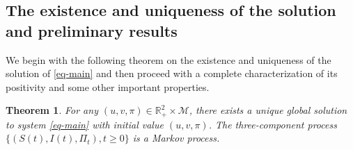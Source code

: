 \documentclass[12pt]{amsart}
\newtheorem{thm}{Theorem}[section]
\theoremstyle{remark}
\numberwithin{equation}{section}
\newcommand{\M}{\mathcal{M}}
\newcommand{\F}{\mathcal{F}}
\newcommand{\PP}{\mathbb{P}}
\newcommand{\R}{\mathbb{R}}
\numberwithin{equation}{section}
\newcommand{\1}{\boldsymbol{1}}
\begin{document}
\subsection{The existence and uniqueness of the solution and preliminary results}
We begin with the following theorem on the existence and uniqueness of the solution of \eqref{eq-main}
and then proceed with a complete characterization of its positivity and some other important properties.

\begin{thm}\label{thm-exi}
	For any $(u, v,\pi)\in\R_+^2\times\M$, there exists a unique global solution
to
system \eqref{eq-main} with initial value $(u,v,\pi)$.
	The three-component process $\{(S(t), I(t),\Pi_t), t\geq0\}$
	is a Markov process.
\end{thm}
\end{document}
